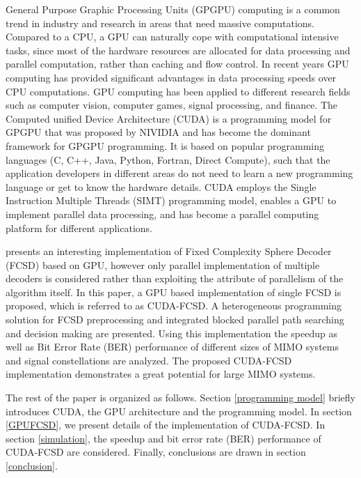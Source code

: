 \documentclass[letterpaper, 10pt, conference,twoside]{ieeeconf}
\begin{document}
General Purpose Graphic Processing Units (GPGPU) computing is a common trend in industry and research in areas that need massive computations. Compared to a CPU, a GPU can naturally cope with computational intensive tasks, since most of the hardware resources are allocated for data processing and parallel computation, rather than caching and flow control\cite{cook2013cuda}. In recent years GPU computing has provided significant advantages in data processing speeds over CPU computations\cite{nvidia2008programming}. GPU computing has been applied to different research fields such as computer vision\cite{fung2008using}, computer games\cite{blewitt2013applicability}, signal processing\cite{van2011accelerating}\cite{6671435}, and finance\cite{grauer2013accelerating}. The Computed unified Device Architecture (CUDA)\cite{cook2013cuda}\cite{nvidia2008programming} is a programming model for GPGPU that was proposed by NIVIDIA and has become the dominant framework for GPGPU programming. It is based on popular programming languages (C, C++, Java, Python, Fortran, Direct Compute), such that the application developers in different areas do not need to learn a new programming language or get to know the hardware details. CUDA employs the Single Instruction Multiple Threads (SIMT) programming model, enables a GPU to implement parallel data processing, and has become a parallel computing platform for different applications.

 \cite{hongyuan2010fixed} presents an interesting implementation of Fixed Complexity Sphere Decoder (FCSD) based on GPU, however only parallel implementation of multiple decoders is considered rather than exploiting the attribute of parallelism of the algorithm itself. In this paper, a GPU based implementation of single FCSD is proposed, which is referred to as CUDA-FCSD. A heterogeneous programming solution for FCSD preprocessing and integrated blocked parallel path searching and decision making are presented. Using this implementation the speedup as well as Bit Error Rate (BER) performance of different sizes of MIMO systems and signal constellations are analyzed. The proposed CUDA-FCSD implementation demonstrates a great potential for large MIMO systems.

The rest of the paper is organized as follows. Section \ref{programming model} briefly introduces CUDA, the GPU architecture and the programming model. In section \ref{GPUFCSD}, we present details of the implementation of CUDA-FCSD. In section \ref{simulation}, the speedup and bit error rate (BER) performance of CUDA-FCSD are considered. Finally, conclusions are drawn in section \ref{conclusion}.    
\end{document}
